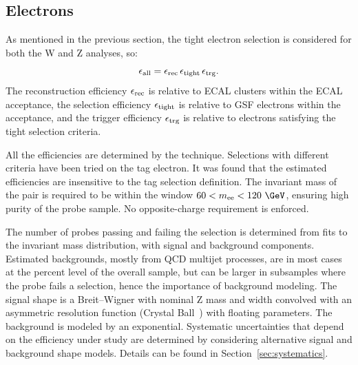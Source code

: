 
\subsection{Electrons}
\label{sec:ELEefficiencies}

As mentioned in the previous section, 
the tight electron selection is considered for both the W and Z analyses, so:
\begin{equation}
   \epsilon_{\textrm{all}}   =  \epsilon_{\textrm{rec}}  \,  \epsilon_{\textrm{tight}}  \,  \epsilon_{\textrm{trg}}  .
\label{eq:e-eff}
\end{equation}
The reconstruction efficiency $ \epsilon_{\textrm{rec}}  $ is relative to ECAL clusters
within the ECAL acceptance, the selection efficiency $ \epsilon_{\textrm{tight}}  $ is relative to GSF electrons
within the acceptance, and the trigger efficiency $ \epsilon_{\textrm{trg}}  $ is relative to electrons
satisfying the tight selection criteria.

\par
All the efficiencies are determined by the \TNP technique.
Selections with different criteria have been 
tried on the tag electron. It was found that the estimated efficiencies are 
insensitive to the tag selection definition. 
The invariant mass of the \TNP pair
is required to be within the window $60<m_{\mathrm{ee}}<120~\GeV$,
ensuring high purity of the probe sample. No opposite-charge requirement
is enforced.

The number of probes passing and failing the selection is
determined from fits to the invariant mass distribution,
with signal and background components.
Estimated backgrounds, mostly from QCD multijet processes, are in most cases
at the percent level of the overall sample, but can be larger in subsamples
where the probe fails a selection, hence the importance of background
modeling. The signal shape is a Breit--Wigner with nominal Z mass and width convolved with an
asymmetric resolution function (Crystal Ball~\cite{CrystalBall}) with floating parameters.  The
background is modeled by an exponential. Systematic uncertainties that depend on the efficiency
under study are determined by considering alternative signal and background shape models.
Details can be found in Section~\ref{sec:systematics}. 

